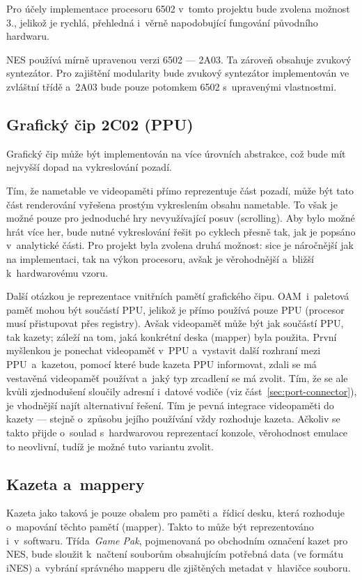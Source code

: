 Pro účely implementace procesoru 6502 v~tomto projektu bude zvolena možnost 3., jelikož je rychlá, přehledná i~věrně napodobující fungování původního hardwaru.

NES používá mírně upravenou verzi 6502 --- 2A03. Ta zároveň obsahuje zvukový syntezátor. Pro zajištění modularity bude zvukový syntezátor implementován ve zvláštní třídě a~2A03 bude pouze potomkem 6502 s~upravenými vlastnostmi.

\subsection{Grafický čip 2C02 (PPU)}
Grafický čip může být implementován na více úrovních abstrakce, což bude mít nejvyšší dopad na vykreslování pozadí.

Tím, že nametable ve videopaměti přímo reprezentuje část pozadí, může být tato část renderování vyřešena prostým vykreslením obsahu nametable. To však je možné pouze pro jednoduché hry nevyužívající posuv (scrolling). Aby bylo možné hrát více her, bude nutné vykreslování řešit po cyklech přesně tak, jak je popsáno v~analytické části. Pro projekt byla zvolena druhá možnost: sice je náročnější jak na implementaci, tak na výkon procesoru, avšak je věrohodnější a~bližší k~hardwarovému vzoru.

Další otázkou je reprezentace vnitřních pamětí grafického čipu. OAM~i~paletová paměť mohou být součástí PPU, jelikož je přímo používá pouze PPU (procesor musí přistupovat přes registry). Avšak videopaměť může být jak součástí PPU, tak kazety; záleží na tom, jaká konkrétní deska (mapper) byla použita. První myšlenkou je ponechat videopaměť v~PPU a~vystavit další rozhraní mezi PPU~a~kazetou, pomocí které bude kazeta PPU informovat, zdali se má vestavěná videopaměť používat a~jaký typ zrcadlení se má zvolit. Tím, že se ale kvůli zjednodušení sloučily adresní i~datové vodiče (viz část~\ref{sec:port-connector}), je vhodnější najít alternativní řešení. Tím je pevná integrace videopaměti do kazety --- stejně o~způsobu jejího používání vždy rozhoduje kazeta. Ačkoliv se takto přijde o~soulad s~hardwarovou reprezentací konzole, věrohodnost emulace to neovlivní, tudíž je možné tuto variantu zvolit.

\subsection{Kazeta a~mappery}
Kazeta jako taková je pouze obalem pro paměti a~řídicí desku, která rozhoduje o~mapování těchto pamětí (mapper). Takto to může být reprezentováno i~v~softwaru. Třída~\emph{Game Pak}, pojmenovaná po obchodním označení kazet pro NES, bude sloužit k~načtení souborům obsahujícím potřebná data (ve formátu iNES) a~vybrání správného mapperu dle zjištěných metadat v~hlavičce souboru.

